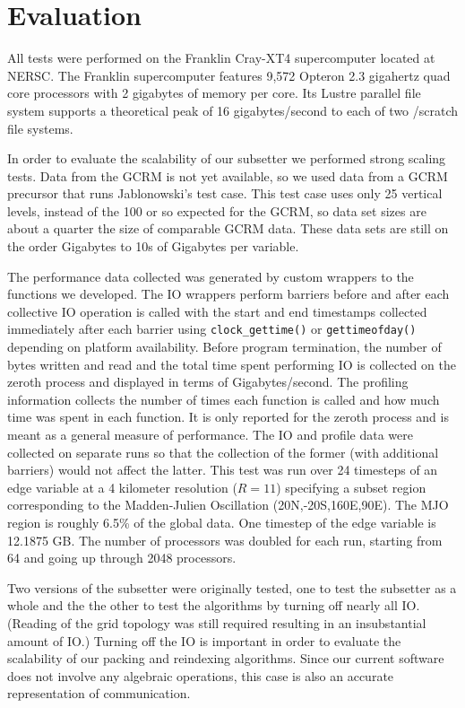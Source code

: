 \section{Evaluation}
\label{section:evaluation}

All tests were performed on the Franklin Cray-XT4 supercomputer\cite{franklin}
located at NERSC\cite{NERSC}.  The Franklin supercomputer features 9,572
Opteron 2.3 gigahertz quad core processors with 2 gigabytes of memory per
core.  Its Lustre parallel file system supports a theoretical peak of 16
gigabytes/second to each of two /scratch file systems.

In order to evaluate the scalability of our subsetter we performed strong
scaling tests. Data from the GCRM is not yet available, so we used data from a
GCRM precursor that runs Jablonowski's test case\cite{JAB}. This test case uses
only 25 vertical levels, instead of the 100 or so expected for the GCRM, so
data set sizes are about a quarter the size of comparable GCRM data. These data
sets are still on the order Gigabytes to 10s of Gigabytes per variable.

The performance data collected was generated by custom
wrappers to the functions we developed.  The IO wrappers perform barriers
before and after each collective IO operation is called with the start and end
timestamps collected immediately after each barrier using
\verb=clock_gettime()= or \verb=gettimeofday()= depending on platform
availability.  Before program termination, the number of bytes written and
read and the total time spent performing IO is collected on the zeroth process
and displayed in terms of Gigabytes/second.  The profiling information
collects the number of times each function is called and how much time was
spent in each function.  It is only reported for the zeroth process and is
meant as a general measure of performance.  The IO and profile data were
collected on separate runs so that the collection of the former (with
additional barriers) would not affect the latter.  This test was run over 24
timesteps of an edge variable at a 4 kilometer resolution ($R=11$) specifying
a subset region corresponding to the Madden-Julien Oscillation\cite{MJO}
(20N,-20S,160E,90E).  The MJO region is roughly 6.5\% of the global data.  One
timestep of the edge variable is 12.1875 GB.  The number of processors was
doubled for each run, starting from 64 and going up through 2048 processors.

Two versions of the subsetter were originally tested, one to test the
subsetter as a whole and the the other to test the algorithms by turning off
nearly all IO.  (Reading of the grid topology was still required resulting in
an insubstantial amount of IO.)  Turning off the IO is important in order to
evaluate the scalability of our packing and reindexing algorithms.
Since our current
software does not involve any algebraic operations, this case is also an
accurate representation of communication.

